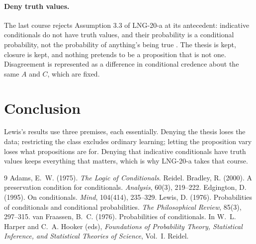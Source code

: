 \documentclass{situationist-preprint}
\begin{document}
\paragraph{Deny truth values.} The last course rejects Assumption 3.3 of LNG-20-a at its antecedent: indicative conditionals do not have truth values, and their probability is a conditional probability, not the probability of anything's being true \citep{Adams1975,Edgington1995}. The thesis is kept, closure is kept, and nothing pretends to be a proposition that is not one. Disagreement is represented as a difference in conditional credence about the same $A$ and $C$, which are fixed.

\section{Conclusion}

Lewis's results use three premises, each essentially. Denying the thesis loses the data; restricting the class excludes ordinary learning; letting the proposition vary loses what propositions are for. Denying that indicative conditionals have truth values keeps everything that matters, which is why LNG-20-a takes that course.

\begin{thebibliography}{9}\small
{} Adams, E.~W. (1975). \emph{The Logic of Conditionals}. Reidel.
 Bradley, R. (2000). A preservation condition for conditionals. \emph{Analysis}, 60(3), 219--222.
 Edgington, D. (1995). On conditionals. \emph{Mind}, 104(414), 235--329.
 Lewis, D. (1976). Probabilities of conditionals and conditional probabilities. \emph{The Philosophical Review}, 85(3), 297--315.
 van Fraassen, B.~C. (1976). Probabilities of conditionals. In W.~L. Harper and C.~A. Hooker (eds), \emph{Foundations of Probability Theory, Statistical Inference, and Statistical Theories of Science}, Vol.~I. Reidel.
\end{thebibliography}
\end{document}
